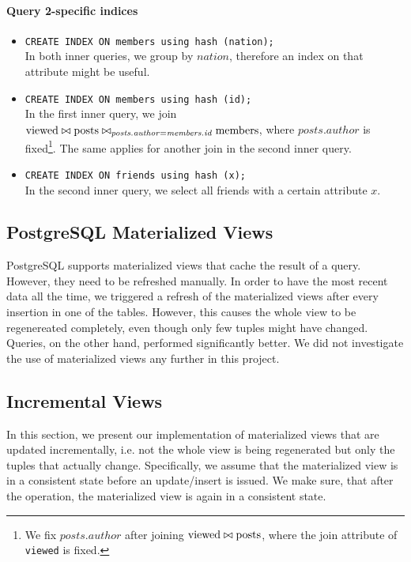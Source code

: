 \documentclass[12pt]{article}
\begin{document}
\paragraph{Query 2-specific indices}
\begin{itemize}
	\item \lstinline{CREATE INDEX ON members using hash (nation);} \\
    In both inner queries, we group by $\mathit{nation}$, therefore an index on that attribute might be useful.
    \item \lstinline{CREATE INDEX ON members using hash (id);} \\
    In the first inner query, we join $\mbox{\lstinline{viewed}} \bowtie \mbox{\lstinline{posts}} \bowtie_{\mathit{posts.author} = \mathit{members.id}} \mbox{\lstinline{members}}$, where $\mathit{posts.author}$ is fixed\footnote{We fix $\mathit{posts.author}$ after joining $\mbox{\lstinline{viewed}} \bowtie \mbox{\lstinline{posts}}$, where the join attribute of \lstinline{viewed} is fixed.}. The same applies for another join in the second inner query.
   \item \lstinline{CREATE INDEX ON friends using hash (x);}\\
   In the second inner query, we select all friends with a certain attribute $x$.
\end{itemize}

\subsection{PostgreSQL Materialized Views}
PostgreSQL supports materialized views that cache the result of a query. However, they need to be refreshed manually. In order to have the most recent data all the time, we triggered a refresh of the materialized views after every insertion in one of the tables. However, this causes the whole view to be regenereated completely, even though only few tuples might have changed. Queries, on the other hand, performed significantly better. We did not investigate the use of materialized views any further in this project.

\subsection{Incremental Views}
In this section, we present our implementation of materialized views that are updated incrementally, i.e. not the whole view is being regenerated but only the tuples that actually change. Specifically, we assume that the materialized view is in a consistent state before an update/insert is issued. We make sure, that after the operation, the materialized view is again in a consistent state.
\end{document}
